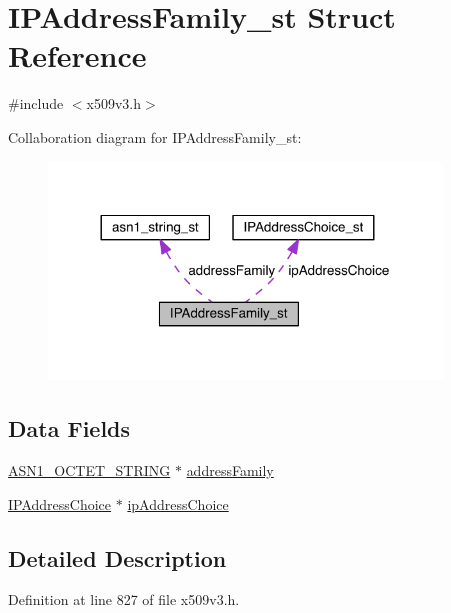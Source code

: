 \hypertarget{struct_i_p_address_family__st}{}\section{I\+P\+Address\+Family\+\_\+st Struct Reference}
\label{struct_i_p_address_family__st}


{\ttfamily \#include $<$x509v3.\+h$>$}



Collaboration diagram for I\+P\+Address\+Family\+\_\+st\+:\nopagebreak
\begin{figure}[H]
\begin{center}
\leavevmode
\includegraphics[width=296pt]{struct_i_p_address_family__st__coll__graph}
\end{center}
\end{figure}
\subsection*{Data Fields}
\begin{DoxyCompactItemize}
\item 
\hyperlink{crypto_2ossl__typ_8h_afbd05e94e0f0430a2b729473efec88c1}{A\+S\+N1\+\_\+\+O\+C\+T\+E\+T\+\_\+\+S\+T\+R\+I\+NG} $\ast$ \hyperlink{struct_i_p_address_family__st_ae34a1e49f531df5650cb0b32e4a72d06}{address\+Family}
\item 
\hyperlink{crypto_2x509v3_2x509v3_8h_a0082f4fd16cfd2beefabdd4af784edfd}{I\+P\+Address\+Choice} $\ast$ \hyperlink{struct_i_p_address_family__st_a3b73327c4ffea3e5b47b96435b076b16}{ip\+Address\+Choice}
\end{DoxyCompactItemize}


\subsection{Detailed Description}


Definition at line 827 of file x509v3.\+h.



